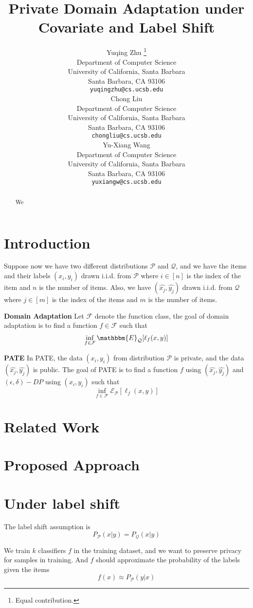 \documentclass{article}
\title{Private Domain Adaptation under Covariate and Label Shift}
\author{
	Yuqing Zhu \thanks{Equal contribution.}\\
	Department of Computer Science \\
	University of California, Santa Barbara \\
	Santa Barbara, CA 93106 \\
	\texttt{yuqingzhu@cs.ucsb.edu} \\
	\And
	Chong Liu \printfnsymbol{1} \\
	Department of Computer Science \\
	University of California, Santa Barbara \\
	Santa Barbara, CA 93106 \\
	\texttt{chongliu@cs.ucsb.edu} \\
	\And
	Yu-Xiang Wang \\
	Department of Computer Science \\
	University of California, Santa Barbara \\
	Santa Barbara, CA 93106 \\
	\texttt{yuxiangw@cs.ucsb.edu} \\
}
\def\cE{\mathcal{E}}
\theoremstyle{definition}
\begin{document}
\maketitle

\begin{abstract}
    We
\end{abstract}

\section{Introduction}
Suppose now we have two different distributions $\mathcal{P}$ and $\mathcal{Q}$, and we have the items and their labels $(x_i,y_i)$ drawn i.i.d. from $\mathcal{P}$ where $i\in [n]$ is the index of the item and $n$ is the number of items. Also, we have $(\hat{x_j},\hat{y_j})$ drawn i.i.d. from $\mathcal{Q}$ where $j\in [m]$ is the index of the items and $m$ is the number of items.

\textbf{Domain Adaptation}
Let $\mathcal{F}$ denote the function class, the goal of domain adaptation is to find a function $f\in \mathcal{F}$ such that
\begin{align*}
    \inf_{f\in \mathcal{F}} \mathbbm{E}_{\mathcal{Q}}[ \ell_f (x,y)]
\end{align*}

\textbf{PATE}
In PATE, the data $(x_i, y_i)$ from distribution $\mathcal{P}$ is private, and the data $(\hat{x_j}, \hat{y_j})$ is public. The goal of PATE is to find a function $f$ using $(\hat{x_j}, \hat{y_j})$ and $(\epsilon,\delta)-DP$ using $(x_i, y_i)$ such that
\[
\inf_{f\in \mathcal{F}} \cE_{\mathcal{P}}[ \ell_f (x,y)]
\]

\section{Related Work}

\section{Proposed Approach}
\section{Under label shift}
The label shift assumption is
\[
P_{\mathcal{P}}(x|y) = P_{\mathcal{Q}}(x|y)
\]

We train $k$ classifiers $f$ in the training dataset, and we want to preserve privacy for samples in training. And $f$ should approximate the probability of the labels given the items
\[
f(x)\approx P_\mathcal{P}(y|x)
\]
\end{document}
